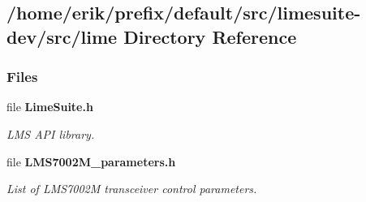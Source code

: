 \subsection{/home/erik/prefix/default/src/limesuite-\/dev/src/lime Directory Reference}
\label{dir_e169531a5f305cf6001652a069fc8493}
\subsubsection*{Files}
\begin{DoxyCompactItemize}
\item 
file {\bf Lime\+Suite.\+h}
\begin{DoxyCompactList}\small\item\em L\+MS A\+PI library. \end{DoxyCompactList}\item 
file {\bf L\+M\+S7002\+M\+\_\+parameters.\+h}
\begin{DoxyCompactList}\small\item\em List of L\+M\+S7002M transceiver control parameters. \end{DoxyCompactList}\end{DoxyCompactItemize}

